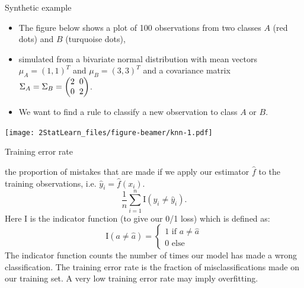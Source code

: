 \documentclass[ignorenonframetext,]{beamer}
\providecommand{\tightlist}{%
  \setlength{\itemsep}{0pt}\setlength{\parskip}{0pt}}
\begin{document}
\begin{frame}

\begin{block}{Synthetic example}

\begin{itemize}
\tightlist
\item
  The figure below shows a plot of 100 observations from two classes
  \(A\) (red dots) and \(B\) (turquoise dots),
\item
  simulated from a bivariate normal distribution with mean vectors
  \(\mu_A = (1, 1)^T\) and \(\mu_B = (3, 3)^T\) and a covariance matrix
  \(\Sigma_A = \Sigma_B = \begin{pmatrix} 2\hspace{2mm} 0 \\ 0 \hspace{2mm} 2 \end{pmatrix}\).
\item
  We want to find a rule to classify a new observation to class \(A\) or
  \(B\).
\end{itemize}

\end{block}

\end{frame}

\begin{frame}

\texttt{[image: 2StatLearn\_files/figure-beamer/knn-1.pdf]}

\end{frame}

\begin{frame}

\begin{block}{Training error rate}

the proportion of mistakes that are made if we apply our estimator
\(\hat{f}\) to the training observations, i.e.
\(\hat{y}_i=\hat{f}(x_i)\).
\[\frac{1}{n}\sum_{i=1}^n \text{I}(y_i \neq \hat{y}_i).\] Here I is the
indicator function (to give our 0/1 loss) which is defined as:
\[\text{I}(a\neq\hat{a}) = \begin{cases} 1 \text{ if } a \neq \hat{a} \\ 0 \text{ else } \end{cases}\]
The indicator function counts the number of times our model has made a
wrong classification. The training error rate is the fraction of
misclassifications made on our training set. A very low training error
rate may imply overfitting.

\end{block}

\end{frame}
\end{document}
